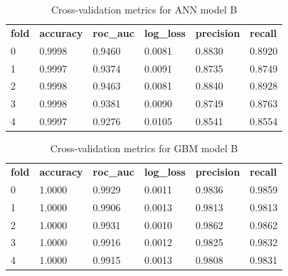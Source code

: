 \documentclass{article}
\begin{document}
\begin{table}[H]
\begin{tabular}{llllll}
\textbf{fold} & \textbf{accuracy} & \textbf{roc\_auc} & \textbf{log\_loss} & \textbf{precision} & \textbf{recall} \\
0             & 0.9998            & 0.9460            & 0.0081             & 0.8830             & 0.8920          \\
1             & 0.9997            & 0.9374            & 0.0091             & 0.8735             & 0.8749          \\
2             & 0.9998            & 0.9463            & 0.0081             & 0.8840             & 0.8928          \\
3             & 0.9998            & 0.9381            & 0.0090             & 0.8749             & 0.8763          \\
4             & 0.9997            & 0.9276            & 0.0105             & 0.8541             & 0.8554         
\end{tabular}
\caption{Cross-validation metrics for ANN model B}
\end{table}

\begin{table}[H]
\begin{tabular}{llllll}
\textbf{fold} & \textbf{accuracy} & \textbf{roc\_auc} & \textbf{log\_loss} & \textbf{precision} & \textbf{recall} \\
0             & 1.0000            & 0.9929            & 0.0011             & 0.9836             & 0.9859          \\
1             & 1.0000            & 0.9906            & 0.0013             & 0.9813             & 0.9813          \\
2             & 1.0000            & 0.9931            & 0.0010             & 0.9862             & 0.9862          \\
3             & 1.0000            & 0.9916            & 0.0012             & 0.9825             & 0.9832          \\
4             & 1.0000            & 0.9915            & 0.0013             & 0.9808             & 0.9831         
\end{tabular}
\caption{Cross-validation metrics for GBM model B}
\end{table}
\end{document}
